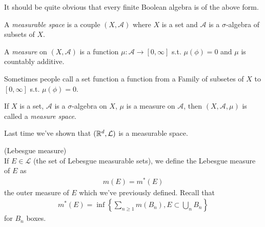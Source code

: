 \documentclass[a4paper]{article}
\begin{document}
It should be quite obvious that every finite Boolean algebra is of the above form.

\begin{defi}
A \emph{measurable space} is a couple $(X,\mathcal{A})$ where $X$ is a set and $\mathcal{A}$ is a $\sigma$-algebra of subsets of $X$.
\end{defi}

\begin{defi}
A \emph{measure} on $(X,\mathcal{A})$ is a function $\mu:\mathcal{A} \to [0,\infty]$ s.t. $\mu(\phi)=0$ and $\mu$ is countably additive.
\end{defi}

\begin{rem}
Sometimes people call a set function a function from a Family of subsetes of $X$ to $[0,\infty]$ s.t. $\mu(\phi)=0$.
\end{rem}

\begin{defi}
If $X$ is a set, $\mathcal{A}$ is a $\sigma$-algebra on $X$, $\mu$ is a measure on $\mathcal{A}$, then $(X,\mathcal{A},\mu)$ is called a \emph{measure space}.
\end{defi}

Last time we've shown that $(\mathbb{R}^d,\mathcal{L})$ is a measurable space.

\begin{defi} (Lebesgue measure)\\
If $E \in \mathcal{L}$ (the set of Lebesgue measurable sets), we define the Lebesgue measure of $E$ as
\begin{equation*}
\begin{aligned}
m(E) = m^*(E)
\end{aligned}
\end{equation*}
the outer measure of $E$ which we've previously defined. Recall that
\begin{equation*}
\begin{aligned}
m^*(E) = \inf \left\{ \sum_{n \geq 1} m(B_n), E \subset \bigcup_n B_n\right\}
\end{aligned}
\end{equation*}
for $B_n$ boxes.
\end{defi}
\end{document}
